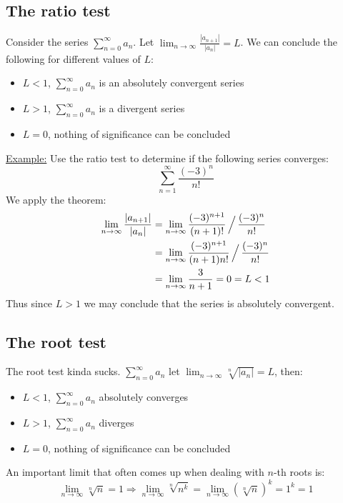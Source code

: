 \documentclass[11pt, a4paper]{article}
\numberwithin{equation}{section}
\numberwithin{figure}{section}
\begin{document}
\subsection{The ratio test}
Consider the series $\sum_{n=0}^\infty a_n$. Let $\lim_{n\to\infty} \frac{|a_{n+1}|}{|a_n|} = L$. We can conclude the following for different values of $L$:
\begin{itemize}
  \item $L < 1$, $\sum_{n=0}^{\infty} a_n$ is an absolutely convergent series
  \item $L > 1$, $\sum_{n=0}^{\infty} a_n$ is a divergent series
  \item $L = 0$, nothing of significance can be concluded
\end{itemize}
\underline{Example:}
Use the ratio test to determine if the following series converges:
\begin{equation*}
  \sum_{n=1}^{\infty} \frac{(-3)^n}{n!}
\end{equation*}
We apply the theorem:
\begin{align*}
  \lim_{n\to\infty} \frac{|a_{n+1}|}{|a_n|} &= \lim_{n\to\infty} \frac{(-3)^{n+1}}{(n+1)!} \, \Big{/}\, \frac{(-3)^n}{n!}\\
  &=  \lim_{n\to\infty} \frac{(-3)^{n+1}}{(n+1)n!} \, \Big{/}\, \frac{(-3)^n}{n!}\\
  &=  \lim_{n\to\infty} \frac{3}{n+1} = 0 = L < 1
\end{align*}
Thus since $L > 1$ we may conclude that the series is absolutely convergent.


\subsection{The root test}
The root test kinda sucks. $\sum_{n=0}^\infty a_n$ let $\lim_{n\to\infty} \sqrt[n]{|a_n|} = L$, then:
\begin{itemize}
  \item $L < 1$, $\sum_{n=0}^{\infty} a_n$ absolutely converges
  \item $L > 1$, $\sum_{n=0}^{\infty} a_n$ diverges
  \item $L = 0$, nothing of significance can be concluded
\end{itemize}
An important limit that often comes up when dealing with $n$-th roots is:
\begin{equation}
  \lim_{n\to\infty} \sqrt[n]{n} = 1 \Rightarrow \lim_{n\to\infty} \sqrt[n]{n^k} = \lim_{n\to\infty} (\sqrt[n]{n})^k = 1^k = 1
\end{equation}
\end{document}
